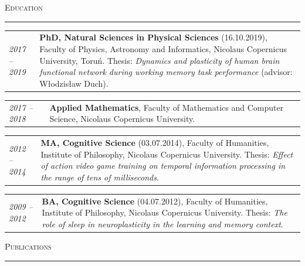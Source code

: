 \documentclass[10pt, a4paper]{article}
\makeatletter
\newcommand{\cvsection}[1]{%
  \vspace{1.4em}%
  {\large\scshape #1}%
  \vspace{0.25em}%
  \par\noindent\textcolor{rule}{\rule{\linewidth}{0.4pt}}%
  \vspace{0.5em}%
}
\newcommand{\cventry}[2]{%
  \begin{tabular*}{\linewidth}{@{}p{2.8cm}@{\hspace{0.5em}}p{\dimexpr\linewidth-3.3cm}@{}}
    \textcolor{accent}{\small\itshape #1} & #2 \\[0.2em]
  \end{tabular*}%
}
\makeatother
\begin{document}
\cvsection{Education}

\cventry{2017 -- 2019}{\textbf{PhD, Natural Sciences in Physical Sciences} (16.10.2019), Faculty of Physics, Astronomy and Informatics, Nicolaus Copernicus University, Toru\'n. Thesis: \textit{Dynamics and plasticity of human brain functional network during working memory task performance} (advisor: W{\l}odzis{\l}aw Duch).}

\cventry{2017 -- 2018}{\textbf{Applied Mathematics}, Faculty of Mathematics and Computer Science, Nicolaus Copernicus University.}

\cventry{2012 -- 2014}{\textbf{MA, Cognitive Science} (03.07.2014), Faculty of Humanities, Institute of Philosophy, Nicolaus Copernicus University. Thesis: \textit{Effect of action video game training on temporal information processing in the range of tens of milliseconds}.}

\cventry{2009 -- 2012}{\textbf{BA, Cognitive Science} (04.07.2012), Faculty of Humanities, Institute of Philosophy, Nicolaus Copernicus University. Thesis: \textit{The role of sleep in neuroplasticity in the learning and memory context}.}

\cvsection{Publications}
\end{document}
